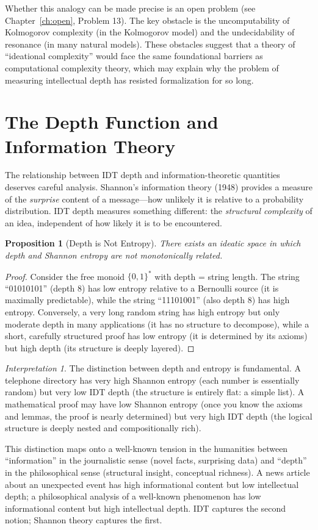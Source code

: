 \documentclass[11pt,openany]{book}
\theoremstyle{definition}
\theoremstyle{plain}
\newtheorem{proposition}[axiom]{Proposition}
\theoremstyle{remark}
\newtheorem{interpretation}[axiom]{Interpretation}
\begin{document}
Whether this analogy can be made precise is an open problem (see Chapter~\ref{ch:open}, Problem 13). The key obstacle is the uncomputability of Kolmogorov complexity (in the Kolmogorov model) and the undecidability of resonance (in many natural models). These obstacles suggest that a theory of ``ideational complexity'' would face the same foundational barriers as computational complexity theory, which may explain why the problem of measuring intellectual depth has resisted formalization for so long.

\section{The Depth Function and Information Theory}

The relationship between IDT depth and information-theoretic quantities deserves careful analysis. Shannon's information theory (1948) provides a measure of the \emph{surprise} content of a message---how unlikely it is relative to a probability distribution. IDT depth measures something different: the \emph{structural complexity} of an idea, independent of how likely it is to be encountered.

\begin{proposition}[Depth is Not Entropy]
There exists an ideatic space in which depth and Shannon entropy are not monotonically related.
\end{proposition}

\begin{proof}
Consider the free monoid $\{0, 1\}^*$ with depth = string length. The string ``01010101'' (depth 8) has low entropy relative to a Bernoulli source (it is maximally predictable), while the string ``11101001'' (also depth 8) has high entropy. Conversely, a very long random string has high entropy but only moderate depth in many applications (it has no structure to decompose), while a short, carefully structured proof has low entropy (it is determined by its axioms) but high depth (its structure is deeply layered).
\end{proof}

\begin{interpretation}
The distinction between depth and entropy is fundamental. A telephone directory has very high Shannon entropy (each number is essentially random) but very low IDT depth (the structure is entirely flat: a simple list). A mathematical proof may have low Shannon entropy (once you know the axioms and lemmas, the proof is nearly determined) but very high IDT depth (the logical structure is deeply nested and compositionally rich).

This distinction maps onto a well-known tension in the humanities between ``information'' in the journalistic sense (novel facts, surprising data) and ``depth'' in the philosophical sense (structural insight, conceptual richness). A news article about an unexpected event has high informational content but low intellectual depth; a philosophical analysis of a well-known phenomenon has low informational content but high intellectual depth. IDT captures the second notion; Shannon theory captures the first.
\end{interpretation}
\end{document}
